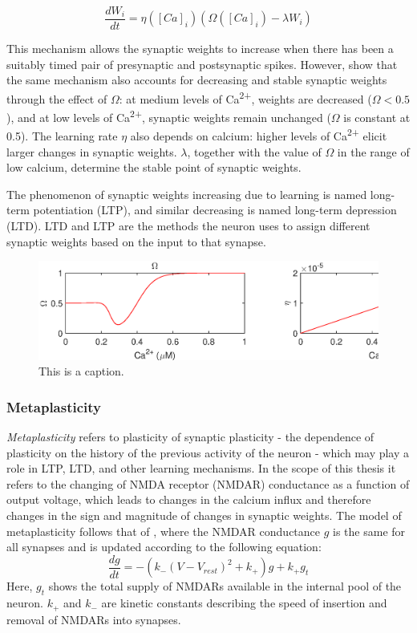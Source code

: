 \documentclass[a4paper,12pt]{report}
\theoremstyle{definition}
\begin{document}
\begin{equation}
\frac{dW_i}{dt} = \eta ([Ca]_i) (\Omega([Ca]_i) - \lambda W_i)
\label{eq:weightupdate}
\end{equation}

This mechanism allows the synaptic weights to increase when there has been a suitably timed pair of presynaptic and postsynaptic spikes. However, \cite{shouval2002unified} show that the same mechanism also accounts for decreasing and stable synaptic weights through the effect of $\Omega$: at medium levels of Ca\textsuperscript{2+}, weights are decreased ($\Omega<0.5$), and at low levels of Ca\textsuperscript{2+}, synaptic weights remain unchanged ($\Omega$ is constant at 0.5). The learning rate $\eta$ also depends on calcium: higher levels of Ca\textsuperscript{2+} elicit larger changes in synaptic weights. $\lambda$, together with the value of $\Omega$ in the range of low calcium, determine the stable point of synaptic weights.

The phenomenon of synaptic weights increasing due to learning is named long-term potentiation (LTP), and similar decreasing is named long-term depression (LTD). LTD and LTP are the methods the neuron uses to assign different synaptic weights based on the input to that synapse.

\begin{figure}[h]
    \includegraphics[width=\textwidth]{figures/methods_eta_omega.eps}
    \caption{This is a caption.}
    \label{fig:methods_eta_omega}
\end{figure}


\subsubsection{Metaplasticity}
\emph{Metaplasticity} refers to plasticity of synaptic plasticity - the dependence of plasticity on the history of the previous activity of the neuron - which may play a role in LTP, LTD, and other learning mechanisms. In the scope of this thesis it refers to the changing of NMDA receptor (NMDAR) conductance as a function of output voltage, which leads to changes in the calcium influx and therefore changes in the sign and magnitude of changes in synaptic weights. The model of metaplasticity follows that of \cite{yeung2004synaptic}, where the NMDAR conductance $g$ is the same for all synapses and is updated according to the following equation: $$ \frac{dg}{dt}=-(k_- (V-V_{rest})^2 + k_+)g + k_+ g_t $$
Here, $g_t$ shows the total supply of NMDARs available in the internal pool of the neuron. $k_+$ and $k_-$ are kinetic constants describing the speed of insertion and removal of NMDARs into synapses.
\end{document}
